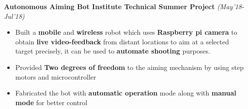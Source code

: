 \documentclass{article}
\begin{document}
\textbf{\large{Autonomous Aiming Bot} \textbar \hspace{} Institute Technical Summer Project} \hfill{\sl \small (May'18-Jul'18)}
\vspace{-4pt}
\begin{itemize}[itemsep = -0.75 mm, leftmargin=*]
\item  Built a \textbf{mobile} and \textbf{wireless} robot which uses \textbf{Raspberry pi camera} to obtain \textbf{live video-feedback} from distant locations to aim at a selected target precisely, it can be used to \textbf{automate shooting} purposes.
\item Provided \textbf{Two degrees of freedom} to the aiming mechanism by using step motors and microcontroller
\item Fabricated the bot with \textbf{automatic operation} mode along with \textbf{manual mode} for better control
\end{itemize} 
\end{document}
